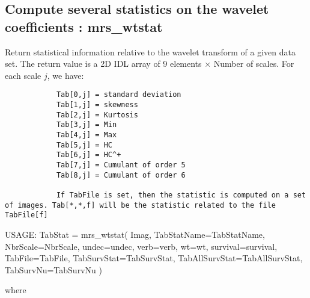 \subsection{Compute several statistics on the wavelet coefficients : mrs\_wtstat}
Return statistical information relative to the wavelet transform of a given data set.
The return value is a 2D IDL array of 9 elements $\times$ Number of scales. For each scale $j$, we have:
\begin{verbatim}
			Tab[0,j] = standard deviation
			Tab[1,j] = skewness
			Tab[2,j] = Kurtosis
			Tab[3,j] = Min
			Tab[4,j] = Max 
			Tab[5,j] = HC
			Tab[6,j] = HC^+
			Tab[7,j] = Cumulant of order 5
			Tab[8,j] = Cumulant of order 6
			
			If TabFile is set, then the statistic is computed on a set of images. Tab[*,*,f] will be the statistic related to the file TabFile[f]
\end{verbatim}
{\bf
\begin{center}
     USAGE: TabStat = mrs\_wtstat( Imag, TabStatName=TabStatName, NbrScale=NbrScale, undec=undec, verb=verb, wt=wt, 
     survival=survival, TabFile=TabFile, TabSurvStat=TabSurvStat, TabAllSurvStat=TabAllSurvStat, TabSurvNu=TabSurvNu )
\end{center}}
where 
